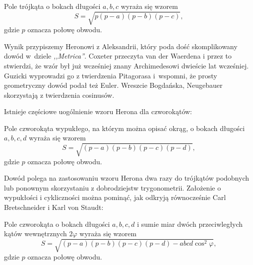 %


\begin{proposition}
    Pole trójkąta o bokach długości $a, b, c$ wyraża się wzorem
    \begin{equation}
        S = \sqrt{p(p-a)(p-b)(p-c)},
    \end{equation}
    gdzie $p$ oznacza połowę obwodu.
\end{proposition}

Wynik przypiszemy Heronowi z Aleksandrii, który poda dość skomplikowany dowód w~dziele \emph{,,Metrica''}.
%
Coxeter \cite[s. 12]{coxeter_1991} przeczyta van der Waerdena \cite[s. 228, 277]{waerden_1961} i przez to stwierdzi, że wzór był już wcześniej znany Archimedesowi dwieście lat wcześniej.
%
Guzicki \cite[s. 165-169]{guzicki_2021} wyprowadzi go z twierdzenia Pitagorasa i~wspomni, że prosty geometryczny dowód podał też Euler.
%
Wreszcie Bogdańska, Neugebauer \cite[s. 92]{neugebauer_2018} skorzystają z twierdzenia cosinusów.

Istnieje częściowe uogólnienie wzoru Herona dla czworokątów:

\begin{proposition}
    \label{brahmagupta_formula}
    Pole czworokąta wypukłego, na którym można opisać okrąg, o bokach długości $a, b, c, d$ wyraża się wzorem
    \begin{equation}
        S = \sqrt{(p-a)(p-b)(p-c)(p-d)},
    \end{equation}
    gdzie $p$ oznacza połowę obwodu.
\end{proposition}

Dowód polega na zastosowaniu wzoru Herona dwa razy do trójkątów podobnych lub ponownym skorzystaniu z dobrodziejstw trygonometrii.
Założenie o wypukłości i cykliczności można pominąć, jak odkryją równocześnie Carl Bretschneider i Karl von Staudt:
%
%

\begin{proposition}
    Pole czworokąta o bokach długości $a, b, c, d$ i sumie miar dwóch przeciwległych kątów wewnętrznych $2 \varphi$ wyraża się wzorem
    \begin{equation}
        S = \sqrt{(p-a)(p-b)(p-c)(p-d) - abcd \cos^2  \varphi},
    \end{equation}
    gdzie $p$ oznacza połowę obwodu.
\end{proposition}

